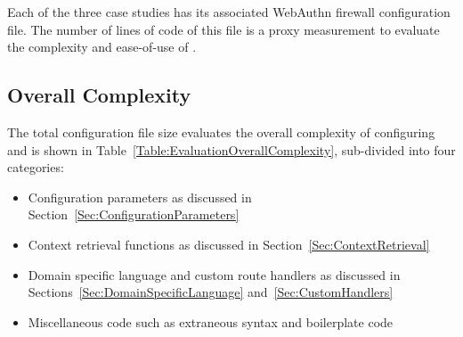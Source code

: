 Each of the three case studies has its associated WebAuthn firewall configuration file. The number of lines of code of this file is a proxy measurement to evaluate the complexity and ease-of-use of \sys{}. 

\subsection{Overall Complexity}\label{Sec:FirewallConfigOverallComplexity}


The total configuration file size evaluates the overall complexity of configuring \sys{} and is shown in Table~\ref{Table:EvaluationOverallComplexity}, sub-divided into four categories:

\begin{itemize}[nosep]

\item Configuration parameters as discussed in Section~\ref{Sec:ConfigurationParameters}

\item Context retrieval functions as discussed in Section~\ref{Sec:ContextRetrieval}

\item Domain specific language and custom route handlers as discussed in Sections~\ref{Sec:DomainSpecificLanguage} and~\ref{Sec:CustomHandlers}

\item Miscellaneous code such as extraneous syntax and boilerplate code

\end{itemize}


